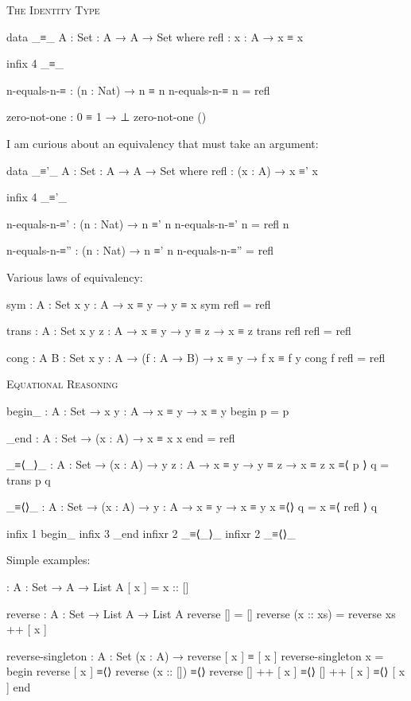 \documentclass{article}
\begin{document}
\noindent
\textsc{The Identity Type}

\begin{code}
data _≡_ {A : Set} : A → A → Set where
    refl : {x : A} → x ≡ x

infix 4 _≡_

n-equals-n-≡ : (n : Nat) → n ≡ n
n-equals-n-≡ n = refl

zero-not-one : 0 ≡ 1 → ⊥
zero-not-one ()
\end{code}

\noindent
I am curious about an equivalency that must take an argument:

\begin{code}
data _≡'_ {A : Set} : A → A → Set where
    refl : (x : A) → x ≡' x

infix 4 _≡'_

n-equals-n-≡' : (n : Nat) → n ≡' n
n-equals-n-≡' n = refl n

n-equals-n-≡'' : (n : Nat) → n ≡' n
n-equals-n-≡'' = refl
\end{code}

\noindent
Various laws of equivalency:

\begin{code}
sym : {A : Set} {x y : A} → x ≡ y → y ≡ x
sym refl = refl

trans : {A : Set} {x y z : A} → x ≡ y → y ≡ z → x ≡ z
trans refl refl = refl

cong : {A B : Set} {x y : A} → (f : A → B) → x ≡ y → f x ≡ f y
cong f refl = refl
\end{code}

\noindent
\textsc{Equational Reasoning}

\begin{code}
begin_ : {A : Set} → {x y : A} → x ≡ y → x ≡ y
begin p = p

_end : {A : Set} → (x : A) → x ≡ x
x end = refl

_≡⟨_⟩_ : {A : Set} → (x : A) → {y z : A}
    → x ≡ y → y ≡ z → x ≡ z
x ≡⟨ p ⟩ q = trans p q

_≡⟨⟩_ : {A : Set} → (x : A) → {y : A} → x ≡ y → x ≡ y
x ≡⟨⟩ q = x ≡⟨ refl ⟩ q

infix 1 begin_
infix 3 _end
infixr 2 _≡⟨_⟩_
infixr 2 _≡⟨⟩_
\end{code}

\noindent
Simple examples:

\begin{code}
[_] : {A : Set} → A → List A
[ x ] = x :: []

reverse : {A : Set} → List A → List A
reverse [] = []
reverse (x :: xs) = reverse xs ++ [ x ]

reverse-singleton : {A : Set} (x : A) → reverse [ x ] ≡ [ x ]
reverse-singleton x =
    begin
      reverse [ x ]
    ≡⟨⟩
      reverse (x :: [])
    ≡⟨⟩
      reverse [] ++ [ x ]
    ≡⟨⟩
      [] ++ [ x ]
    ≡⟨⟩
      [ x ]
    end
\end{code}
\end{document}

